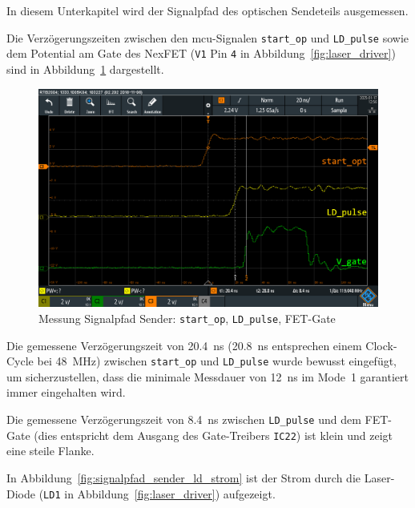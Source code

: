 In diesem Unterkapitel wird der Signalpfad des optischen Sendeteils ausgemessen.

Die Verzögerungszeiten zwischen den \acrshort{mcu}-Signalen \lstinline|start_op| und \lstinline|LD_pulse| sowie dem
Potential am Gate des NexFET (\lstinline|V1| Pin \lstinline|4| in Abbildung~\ref{fig:laser_driver}) sind in
Abbildung~\ref{fig:signalpfad_sender_startopt_ldpulse_fetgate} dargestellt.

\begin{figure}[H]
    \centering
    \includegraphics[width=\textwidth]{graphics/signalpfad_sender_startopt_ldpulse_fetgate.png}
    \caption{Messung Signalpfad Sender: \lstinline|start_op|, \lstinline|LD_pulse|, FET-Gate}\label{fig:signalpfad_sender_startopt_ldpulse_fetgate}
\end{figure}

Die gemessene Verzögerungszeit von 20.4~ns (20.8~ns entsprechen einem Clock-Cycle bei 48~MHz) zwischen
\lstinline|start_op| und \lstinline|LD_pulse| wurde bewusst eingefügt, um sicherzustellen, dass die minimale Messdauer
von 12~ns \cite{ti2016tdc7200_datasheet} im Mode~1 garantiert immer eingehalten wird.

Die gemessene Verzögerungszeit von 8.4~ns zwischen \lstinline|LD_pulse| und dem FET-Gate (dies entspricht dem Ausgang
des Gate-Treibers \lstinline|IC22|) ist klein und zeigt eine steile Flanke.

In Abbildung~\ref{fig:signalpfad_sender_ld_strom} ist der Strom durch die Laser-Diode (\lstinline|LD1| in
Abbildung~\ref{fig:laser_driver}) aufgezeigt.

